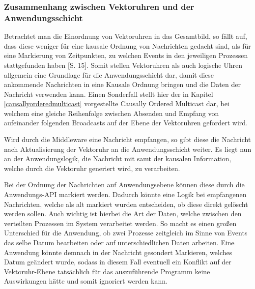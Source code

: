 \subsubsection{Zusammenhang zwischen Vektoruhren und der Anwendungsschicht}
Betrachtet man die Einordnung von Vektoruhren in das Gesamtbild, so fällt auf, dass diese weniger für eine kausale Ordnung von Nachrichten gedacht sind, als für eine Markierung von Zeitpunkten, zu welchen Events in den jeweiligen Prozessen stattgefunden haben \cite{bibid}[S. 15]. Somit stellen Vektoruhren als auch logische Uhren allgemein eine Grundlage für die Anwendungsschicht dar, damit diese ankommende Nachrichten in eine Kausale Ordnung bringen und die Daten der Nachricht verwenden kann. Einen Sonderfall stellt hier der in Kapitel \ref{causallyorderedmulticast} vorgestellte Causally Ordered Multicast dar, bei welchem eine gleiche Reihenfolge zwischen Absenden und Empfang von aufeinander folgenden Broadcasts auf der Ebene der Vektoruhren gefordert wird.

Wird durch die Middleware eine Nachricht empfangen, so gibt diese die Nachricht nach Aktualisierung der Vektoruhr an die Anwendungsschicht weiter. Es liegt nun an der Anwendungslogik, die Nachricht mit samt der kausalen Information, welche durch die Vektoruhr generiert wird, zu verarbeiten. 

Bei der Ordnung der Nachrichten auf Anwendungsebene können diese durch die Anwendungs-API markiert werden. Dadurch könnte eine Logik bei empfangenen Nachrichten, welche als alt markiert wurden entscheiden, ob diese direkt gelöscht werden sollen. Auch wichtig ist hierbei die Art der Daten, welche zwischen den verteilten Prozessen im System verarbeitet werden. So macht es einen großen Unterschied für die Anwendung, ob zwei Prozesse zeitgleich im Sinne von Events das selbe Datum bearbeiten oder auf unterschiedlichen Daten arbeiten. Eine Anwendung könnte demnach in der Nachricht gesondert Markieren, welches Datum geändert wurde, sodass in diesem Fall eventuell ein Konflikt auf der Vektoruhr-Ebene tatsächlich für das auszuführende Programm keine Auswirkungen hätte und somit ignoriert werden kann.